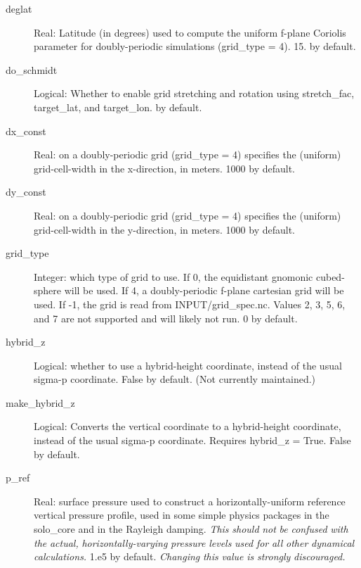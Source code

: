 \documentclass[12pt,letterpaper]{book}
\begin{document}
\begin{description}

\item[deglat] Real: Latitude (in degrees) used to compute the uniform f-plane Coriolis parameter for doubly-periodic simulations 
(grid\_type = 4). 15. by default. 


\item[do\_schmidt] Logical: Whether to enable grid stretching and rotation using stretch\_fac, target\_lat, and target\_lon. \false  by default. 


\item[dx\_const] Real: on a doubly-periodic grid (grid\_type 
= 4) specifies the (uniform) grid-cell-width in the x-direction, in meters. 
1000 by default. 


\item[dy\_const] Real: on a doubly-periodic grid (grid\_type 
= 4) specifies the (uniform) grid-cell-width in the y-direction, in meters. 
1000 by default. 


\item[grid\_type] Integer: which type of grid to use. If 0, the equidistant gnomonic cubed-sphere will be used. If 
4, a doubly-periodic f-plane cartesian grid will be used. If -1, the grid is read from INPUT/grid\_spec.nc. Values 
2, 3, 5, 6, and 7 are not supported and will likely not run. 0 by default. 


\item[hybrid\_z] Logical: whether to use a hybrid-height coordinate, instead of the usual sigma-p coordinate. False by default. 
(Not currently maintained.)


\item[make\_hybrid\_z] Logical: Converts the vertical coordinate to a hybrid-height coordinate, instead of the usual sigma-p coordinate. Requires hybrid\_z 
= True. False by default. 


\item[p\_ref] Real: surface pressure used to construct a horizontally-uniform reference vertical pressure profile, used in some simple physics packages in the solo\_core and in the Rayleigh damping. \textit{This} \textit{should} \textit{not} \textit{be} \textit{confused} \textit{with} \textit{the} \textit{actual}\textit{,} \textit{horizontally}\textit{-}\textit{varying} \textit{pressure} \textit{levels} \textit{used} \textit{for} \textit{all} \textit{other} \textit{dynamical} \textit{calculations}\textit{.} 
1.e5 by default. \textit{Changing} \textit{this} \textit{value} \textit{is} \textit{strongly} \textit{discouraged}\textit{.} 



\end{description}
\end{document}
